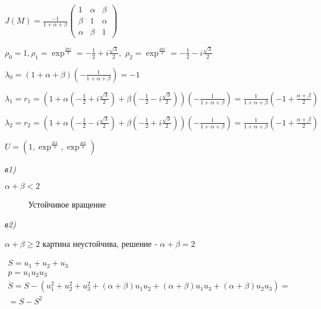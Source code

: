 \documentclass[oneside, final, 12pt]{article}
\begin{document}
\vspace{0.5cm}
\begin{large}
\(
J(M) 
=\frac{-1}{1+\alpha+\beta}
	\begin{pmatrix}
		1 & \alpha & \beta\\
		\beta & 1 & \alpha\\
		\alpha & \beta & 1
	\end{pmatrix}
\)


\vspace{0.5cm}
\(
	\rho_0 = 1, \rho_1 = \exp^{\frac{2\pi i}{3}} = -\frac{1}{2}+i\frac{\sqrt{3}}{2},
\)\hspace{0.1cm}
\(
	\rho_2 = \exp^\frac{4\pi i}{3} = -\frac{1}{2} - i\frac{\sqrt{3}}{2}
\)

\vspace{0.5cm}
\(
\lambda_0 = (1 + \alpha + \beta)(-\frac{1}{1 + \alpha + \beta}) = -1
\)

\vspace{0.5cm}
\(
\lambda_1=r_1 = (1 + \alpha( -\frac{1}{2}+i\frac{\sqrt{3}}{2}) + \beta( -\frac{1}{2} - i\frac{\sqrt{3}}{2}))(-\frac{1}{1 + \alpha + \beta}) = \frac{1}{1 + \alpha + \beta}(-1+\frac{\alpha+\beta}{2})
\)

\vspace{0.5cm}
\(
\lambda_2 = r_2 = (1 + \alpha( -\frac{1}{2} - i\frac{\sqrt{3}}{2}) + \beta( -\frac{1}{2} + i\frac{\sqrt{3}}{2}))(-\frac{1}{1 + \alpha + \beta})=\frac{1}{1 + \alpha + \beta}(-1+\frac{\alpha+\beta}{2})
\)

\vspace{0.5cm}
\(
U = (1, \exp^\frac{2i\pi}{3}, \exp^\frac{4i\pi}{4})
\)

\vspace{0.5cm}
\textit{в1)}

\(
\alpha + \beta < 2
\)
\begin{figure} [h!]
			\caption{Устойчивое вращение}	
\end{figure}
\begin{figure} [h!]
			\caption{}	
\end{figure}

\vspace{0.5cm}
\textit{в2)}

\(
\alpha + \beta \geq 2
\)
\hspace{0.1cm} картина неустойчива, решение - \(\alpha + \beta = 2\)

\vspace{0.5cm}
\(
	\begin{matrix}
		S = u_1 + u_2 + u_3\\
		p = u_1u_2u_3
	\end{matrix}
\)\hspace{1cm}
\(
\begin{matrix}
	\dot{S} = S - (u_1^2 + u_2^2 + u_3^2 +(\alpha + \beta)u_1u_2 + (\alpha + \beta)u_1u_3 + (\alpha + \beta)u_2u_3) =\\ 
		= S - S^2
\end{matrix}
\)


\end{large}
\end{document}

